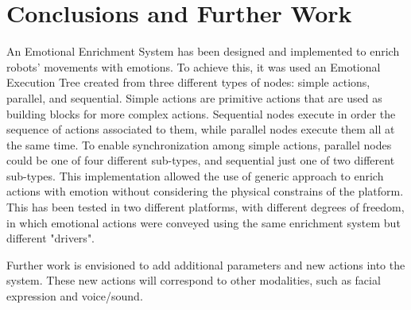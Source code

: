 \documentclass{sig-alternate-05-2015}
\begin{document}
\section{Conclusions and Further Work}

An Emotional Enrichment System has been designed and implemented to enrich robots' movements with emotions. To achieve this, it was used an Emotional Execution Tree created from three different types of nodes: simple actions, parallel, and sequential. Simple actions are primitive actions that are used as building blocks for more complex actions. Sequential nodes execute in order the sequence of actions associated to them, while parallel nodes execute them all at the same time. To enable synchronization among simple actions, parallel nodes could be one of four different sub-types, and sequential just one of two different sub-types. This implementation allowed the use of generic approach to enrich actions with emotion without considering the physical constrains of the platform. This has been tested in two different platforms, with different degrees of freedom, in which emotional actions were conveyed using the same enrichment system but different "drivers". 

Further work is envisioned to add additional parameters and new actions into the system. These new actions will correspond to other modalities, such as facial expression and voice/sound.


\end{document}

